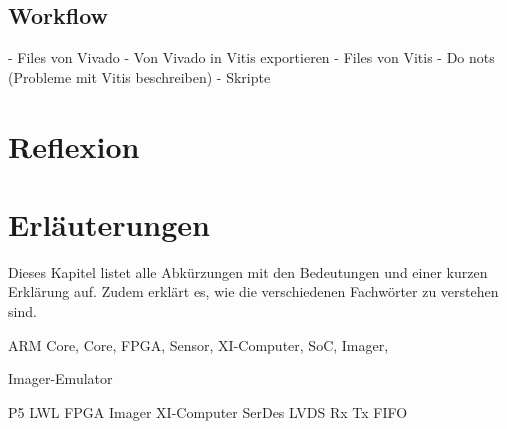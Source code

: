 \documentclass{article}
\begin{document}
\subsection{Workflow}
- Files von Vivado
- Von Vivado in Vitis exportieren
- Files von Vitis
- Do nots (Probleme mit Vitis beschreiben)
- Skripte


\section{Reflexion}



\section{Erläuterungen}
Dieses Kapitel listet alle Abkürzungen mit den Bedeutungen und einer kurzen Erklärung auf. Zudem erklärt es, wie die verschiedenen Fachwörter zu verstehen sind.

ARM Core,
Core,
FPGA,
Sensor,
XI-Computer,
SoC,
Imager,

Imager-Emulator

P5
LWL
FPGA
Imager
XI-Computer
SerDes
LVDS
Rx
Tx
FIFO
\end{document}
